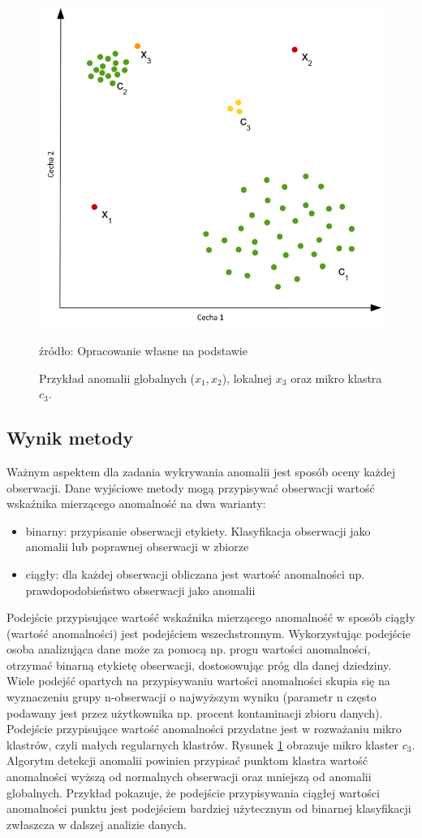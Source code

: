 \begin{figure}[h]
    \centering
    \includegraphics[width=.65\textwidth]{chapters/istniejace/images/mikro_cluste.png}
    \caption{Przykład anomalii globalnych ($x_1, x_2$), lokalnej $x_3$ oraz mikro klastra $c_3$. }
    \footnotesize{źródło: Opracowanie własne na podstawie \cite{goldstein2016comparative}}
    \label{fig:anomalie_glob_lok}
\end{figure}

\subsection{Wynik metody}
\label{sec:score}
Ważnym aspektem dla zadania wykrywania anomalii jest sposób oceny każdej obserwacji. Dane wyjściowe metody mogą przypisywać obserwacji wartość wskaźnika mierzącego anomalność na dwa warianty:
\begin{itemize}
    \item binarny: przypisanie obserwacji etykiety. Klasyfikacja obserwacji jako anomalii lub poprawnej obserwacji w zbiorze
    \item ciągły: dla każdej obserwacji obliczana jest wartość anomalności np. prawdopodobieństwo obserwacji jako anomalii
\end{itemize}
Podejście przypisujące wartość wskaźnika mierzącego anomalność w sposób ciągły (wartość anomalności) jest podejściem wszechstronnym. Wykorzystując podejście osoba analizująca dane może za pomocą np. progu wartości anomalności, otrzymać binarną etykietę obserwacji, dostosowując próg dla danej dziedziny.
Wiele podejść opartych na przypisywaniu wartości anomalności skupia się na wyznaczeniu grupy n-obserwacji o najwyższym wyniku (parametr n często podawany jest przez użytkownika np. procent kontaminacji zbioru danych). 
Podejście przypisujące wartość anomalności przydatne jest w rozważaniu mikro klastrów, czyli małych regularnych klastrów. Rysunek \ref{fig:anomalie_glob_lok} obrazuje mikro klaster $c_3$. Algorytm detekcji anomalii powinien przypisać punktom klastra wartość anomalności wyższą od normalnych obserwacji oraz mniejszą od anomalii globalnych. Przykład pokazuje, że podejście przypisywania ciągłej wartości anomalności punktu jest podejściem bardziej użytecznym od binarnej klasyfikacji zwłaszcza w dalszej analizie danych. 

